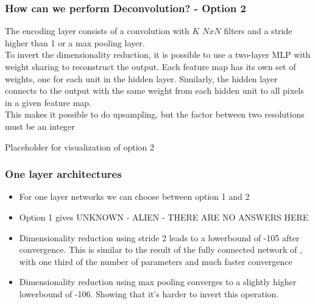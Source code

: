 \documentclass{beamer}
\begin{document}
\begin{frame}
\frametitle{How can we perform Deconvolution? - Option 2}

The encoding layer consists of a convolution with $K$ $NxN$ filters and a stride higher than 1 or a max pooling layer.
\\ \vspace{4mm}
To invert the dimensionality reduction, it is possible to use a two-layer MLP with weight sharing to reconstruct the output. Each feature map has its own set of weights, one for each unit in the hidden layer. Similarly, the hidden layer connects to the output with the same weight from each hidden unit to all pixels in a given feature map.
\\ \vspace{4mm}
This makes it possible to do upsampling, but the factor between two resolutions must be an integer



\end{frame}

\begin{frame}
Placeholder for visualization of option 2
\end{frame}

\begin{frame}
\frametitle{One layer architectures}

\begin{itemize}
	\item For one layer networks we can choose between option 1 and 2
	\item Option 1 gives UNKNOWN - ALIEN - THERE ARE NO ANSWERS HERE
	\item Dimensionality reduction using stride 2 leads to a lowerbound of -105 after convergence. This is similar to the result of the fully connected network of \cite{kingma2013stochastic}, with one third of the number of parameters and much faster convergence
	\item Dimensionality reduction using max pooling converges to a slightly higher lowerbound of -106. Showing that it's  harder to invert this operation.
	\end{itemize}
\end{frame}
\end{document}
